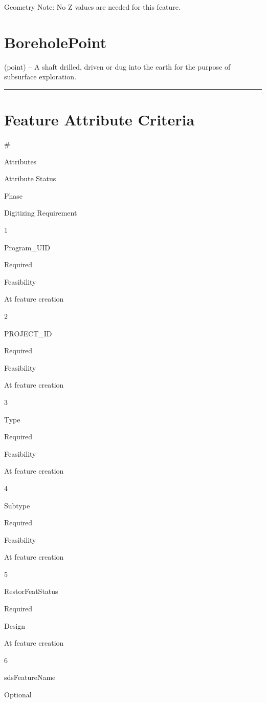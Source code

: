 \documentclass[
  letterpaper,
  DIV=11,
  numbers=noendperiod]{scrreprt}
\begin{document}
Geometry Note: No Z values are needed for this feature.

\section{BoreholePoint}\label{boreholepoint}

(point) -- A shaft drilled, driven or dug into the earth for the purpose
of subsurface exploration.

\begin{center}\rule{0.5\linewidth}{0.5pt}\end{center}

\section{Feature Attribute
Criteria}\label{feature-attribute-criteria-18}

\#

Attributes

Attribute Status

Phase

Digitizing Requirement

1

Program\_UID

Required

Feasibility

At feature creation

2

PROJECT\_ID

Required

Feasibility

At feature creation

3

Type

Required

Feasibility

At feature creation

4

Subtype

Required

Feasibility

At feature creation

5

RestorFeatStatus

Required

Design

At feature creation

6

sdsFeatureName

Optional
\end{document}
